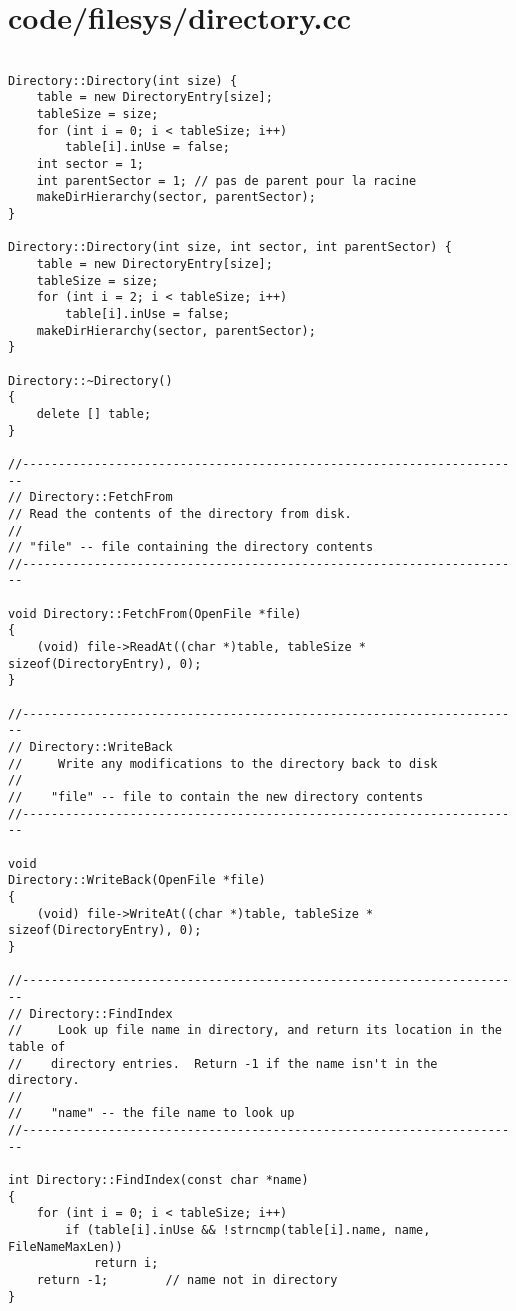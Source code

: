 \documentclass[a4paper,10pt]{article}
\begin{document}
\section{code/filesys/directory.cc}
\begin{lstlisting}

Directory::Directory(int size) {
    table = new DirectoryEntry[size];
    tableSize = size;
    for (int i = 0; i < tableSize; i++)
        table[i].inUse = false;
    int sector = 1;
    int parentSector = 1; // pas de parent pour la racine
    makeDirHierarchy(sector, parentSector);
}

Directory::Directory(int size, int sector, int parentSector) {
    table = new DirectoryEntry[size];
    tableSize = size;
    for (int i = 2; i < tableSize; i++)
        table[i].inUse = false;
    makeDirHierarchy(sector, parentSector);
}

Directory::~Directory()
{
    delete [] table;
}

//----------------------------------------------------------------------
// Directory::FetchFrom
// Read the contents of the directory from disk.
//
// "file" -- file containing the directory contents
//----------------------------------------------------------------------

void Directory::FetchFrom(OpenFile *file)
{
    (void) file->ReadAt((char *)table, tableSize * sizeof(DirectoryEntry), 0);
}

//----------------------------------------------------------------------
// Directory::WriteBack
//     Write any modifications to the directory back to disk
//
//    "file" -- file to contain the new directory contents
//----------------------------------------------------------------------

void
Directory::WriteBack(OpenFile *file)
{
    (void) file->WriteAt((char *)table, tableSize * sizeof(DirectoryEntry), 0);
}

//----------------------------------------------------------------------
// Directory::FindIndex
//     Look up file name in directory, and return its location in the table of
//    directory entries.  Return -1 if the name isn't in the directory.
//
//    "name" -- the file name to look up
//----------------------------------------------------------------------

int Directory::FindIndex(const char *name)
{
    for (int i = 0; i < tableSize; i++)
        if (table[i].inUse && !strncmp(table[i].name, name, FileNameMaxLen))
            return i;
    return -1;        // name not in directory
}


\end{lstlisting}
\end{document}
